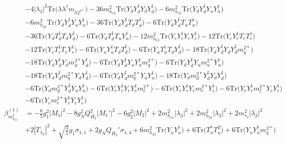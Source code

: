 {\begin{align}
 &-4 |\lambda_3|^2 \mbox{Tr}\Big({\lambda  \lambda^{\dagger}  m_{{h 2}^{2 *}}}\Big) -36 m_{h_{13}}^2 \mbox{Tr}\Big({Y_d  Y_{d}^{\dagger}  Y_d  Y_{d}^{\dagger}}\Big) -6 m_{h_{13}}^2 \mbox{Tr}\Big({Y_d  Y_{d}^{\dagger}  Y_u  Y_{u}^{\dagger}}\Big) \nonumber \\ 
 &-6 m_{h_{23}}^2 \mbox{Tr}\Big({Y_d  Y_{d}^{\dagger}  Y_u  Y_{u}^{\dagger}}\Big) -36 \mbox{Tr}\Big({Y_d  Y_{d}^{\dagger}  T_d  T_{d}^{\dagger}}\Big) -6 \mbox{Tr}\Big({Y_d  Y_{d}^{\dagger}  T_u  T_{u}^{\dagger}}\Big) \nonumber \\ 
 &-36 \mbox{Tr}\Big({Y_d  T_{d}^{\dagger}  T_d  Y_{d}^{\dagger}}\Big) -6 \mbox{Tr}\Big({Y_d  T_{d}^{\dagger}  T_u  Y_{u}^{\dagger}}\Big) -12 m_{h_{13}}^2 \mbox{Tr}\Big({Y_e  Y_{e}^{\dagger}  Y_e  Y_{e}^{\dagger}}\Big) -12 \mbox{Tr}\Big({Y_e  Y_{e}^{\dagger}  T_e  T_{e}^{\dagger}}\Big) \nonumber \\ 
 &-12 \mbox{Tr}\Big({Y_e  T_{e}^{\dagger}  T_e  Y_{e}^{\dagger}}\Big) -6 \mbox{Tr}\Big({Y_u  Y_{u}^{\dagger}  T_d  T_{d}^{\dagger}}\Big) -6 \mbox{Tr}\Big({Y_u  T_{u}^{\dagger}  T_d  Y_{d}^{\dagger}}\Big) -18 \mbox{Tr}\Big({Y_d  Y_{d}^{\dagger}  Y_d  Y_{d}^{\dagger}  m_q^{2 *}}\Big) \nonumber \\ 
 &-18 \mbox{Tr}\Big({Y_d  Y_{d}^{\dagger}  Y_d  m_d^{2 *}  Y_{d}^{\dagger}}\Big) -6 \mbox{Tr}\Big({Y_d  Y_{d}^{\dagger}  Y_u  Y_{u}^{\dagger}  m_q^{2 *}}\Big) -6 \mbox{Tr}\Big({Y_d  Y_{d}^{\dagger}  Y_u  m_u^{2 *}  Y_{u}^{\dagger}}\Big) \nonumber \\ 
 &-18 \mbox{Tr}\Big({Y_d  Y_{d}^{\dagger}  m_q^{2 *}  Y_d  Y_{d}^{\dagger}}\Big) -6 \mbox{Tr}\Big({Y_d  Y_{d}^{\dagger}  m_q^{2 *}  Y_u  Y_{u}^{\dagger}}\Big) -18 \mbox{Tr}\Big({Y_d  m_d^{2 *}  Y_{d}^{\dagger}  Y_d  Y_{d}^{\dagger}}\Big) \nonumber \\ 
 &-6 \mbox{Tr}\Big({Y_d  m_d^{2 *}  Y_{d}^{\dagger}  Y_u  Y_{u}^{\dagger}}\Big) -6 \mbox{Tr}\Big({Y_e  Y_{e}^{\dagger}  Y_e  Y_{e}^{\dagger}  m_l^{2 *}}\Big) -6 \mbox{Tr}\Big({Y_e  Y_{e}^{\dagger}  Y_e  m_e^{2 *}  Y_{e}^{\dagger}}\Big) -6 \mbox{Tr}\Big({Y_e  Y_{e}^{\dagger}  m_l^{2 *}  Y_e  Y_{e}^{\dagger}}\Big) \nonumber \\ 
 &-6 \mbox{Tr}\Big({Y_e  m_e^{2 *}  Y_{e}^{\dagger}  Y_e  Y_{e}^{\dagger}}\Big) \\ 
\beta_{m_{h_{23}}^2}^{(1)} & =  
-\frac{6}{5} g_{1}^{2} |M_1|^2 -8 g_{N}^{2} Q_{H_2}^{2} |M_1'|^2 -6 g_{2}^{2} |M_2|^2 +2 m_{h_{13}}^2 |\lambda_3|^2 +2 m_{h_{23}}^2 |\lambda_3|^2 +2 m_{s_3}^2 |\lambda_3|^2 \nonumber \\ 
 &+2 |T_{\lambda_3}|^2 +\sqrt{\frac{3}{5}} g_1 \sigma_{1,1} +2 g_N Q_{H_2}' \sigma_{1,4} +6 m_{h_{23}}^2 \mbox{Tr}\Big({Y_u  Y_{u}^{\dagger}}\Big) +6 \mbox{Tr}\Big({T_u^*  T_{u}^{T}}\Big) +6 \mbox{Tr}\Big({Y_u  Y_{u}^{\dagger}  m_q^{2 *}}\Big) \nonumber \\ 

\end{align}}
